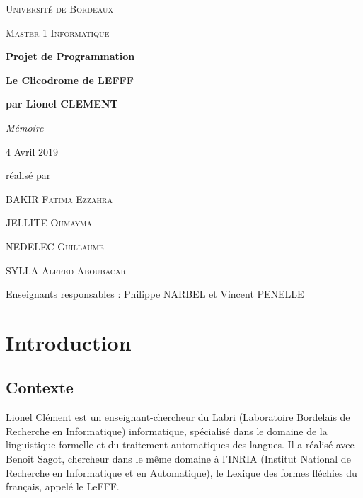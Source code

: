 \documentclass[12pt,a4paper]{article}
\begin{document}
    \begin{titlepage}
        \centering
        {\scshape\LARGE Université de Bordeaux \par}
        {\scshape\Large Master 1 Informatique  \par}
        \vspace{3cm}

        {\Huge\bfseries Projet de Programmation\par}
        {\Huge\bfseries Le Clicodrome de LEFFF \par}
        {\Large\bfseries par Lionel CLEMENT \par}
        \vspace{0.5cm}
        {\Large\itshape Mémoire \par}
        {\large 4 Avril 2019\par}

        \vfill
        réalisé par \par
        BAKIR \textsc{Fatima Ezzahra} \par
        JELLITE \textsc{Oumayma} \par
        NEDELEC \textsc{Guillaume} \par
        SYLLA  \textsc{Alfred Aboubacar} \par
        \vfill

        {\large Enseignants responsables : Philippe NARBEL et Vincent PENELLE\par}

    \end{titlepage}

    \newpage
    \tableofcontents
    \newpage
    \listoffigures

    \newpage

    \section{Introduction}

    \subsection{Contexte}

    \smallbreak Lionel Clément est un enseignant-chercheur du Labri (Laboratoire Bordelais de Recherche en Informatique) informatique, spécialisé dans le domaine de la linguistique formelle et du traitement automatiques des langues. Il a réalisé avec Benoît Sagot, chercheur dans le même domaine à l'INRIA (Institut National de Recherche en Informatique et en Automatique), le Lexique des formes fléchies du français, appelé le LeFFF.
\end{document}
